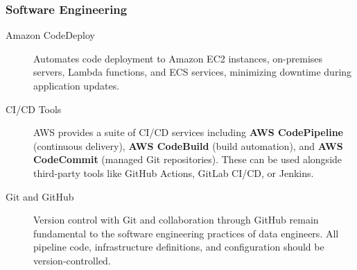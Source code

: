 \documentclass{article}
\begin{document}
\subsubsection{Software Engineering}
\begin{description}
    \item[Amazon CodeDeploy] Automates code deployment to Amazon EC2 instances, on-premises servers, Lambda functions, and ECS services, minimizing downtime during application updates.

    \item[CI/CD Tools] AWS provides a suite of CI/CD services including \textbf{AWS CodePipeline} (continuous delivery), \textbf{AWS CodeBuild} (build automation), and \textbf{AWS CodeCommit} (managed Git repositories). These can be used alongside third-party tools like GitHub Actions, GitLab CI/CD, or Jenkins.

    \item[Git and GitHub] Version control with Git and collaboration through GitHub remain fundamental to the software engineering practices of data engineers. All pipeline code, infrastructure definitions, and configuration should be version-controlled.
\end{description}

\newpage
\end{document}
